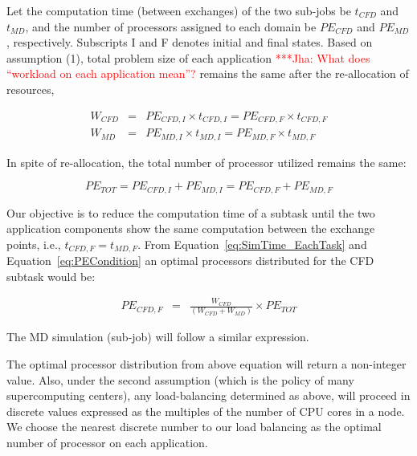 \documentclass[conference,final]{IEEEtran}
\newcommand{\jhanote}[1]{ {\textcolor{red} { ***Jha: #1 }}}
\newcommand{\jhanote}[1]{}
\begin{document}
Let the computation time (between exchanges) of the two sub-jobs be
$t_{CFD}$ and $t_{MD}$, and the number of processors assigned to each
domain be $PE_{CFD}$ and $PE_{MD}$, respectively. Subscripts I and F
denotes initial and final states. Based on assumption (1), total problem size of each application
\jhanote{What does ``workload on each application
  mean''?} 
remains the same after the re-allocation of resources,

\small
\begin{eqnarray}
W_{CFD}&=&PE_{CFD,I}\times t_{CFD,I}=PE_{CFD,F}\times t_{CFD,F} \nonumber \\
W_{MD}&=&PE_{MD,I}\times t_{MD,I}=PE_{MD,F}\times t_{MD,F}
\label{eq:SimTime_EachTask}
\end{eqnarray}
\normalsize

In spite
of re-allocation, the total number of processor utilized remains the
same:

\small
\begin{equation}
PE_{TOT}=PE_{CFD,I}+PE_{MD,I}=PE_{CFD,F}+PE_{MD,F}
\label{eq:PECondition}
\end{equation}
\normalsize


Our objective is to reduce the computation time of a subtask until the
two application components show the same computation between the exchange points,
i.e., $t_{CFD,F} = t_{MD,F}$. From Equation~\ref{eq:SimTime_EachTask}
and Equation~\ref{eq:PECondition} an optimal processors distributed
for the CFD subtask would be:

\small
\begin{eqnarray}
PE_{CFD,F} & = & \frac {W_{CFD}} {(W_{CFD} + W_{MD})} \times PE_{TOT}
\end{eqnarray}
\normalsize

The MD simulation (sub-job) will follow a similar expression. 

The optimal processor distribution from above equation will return a
non-integer value. Also, under the second assumption (which is the
policy of many supercomputing centers), any load-balancing determined
as above, will proceed in discrete values 
expressed as the multiples of the number of CPU cores in a node. We choose the nearest discrete number to our load balancing as the optimal number of processor on each application.
\end{document}
